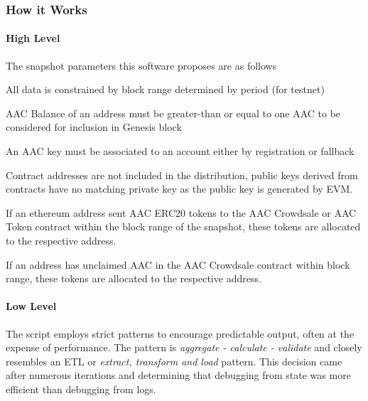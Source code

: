 \subsubsection*{How it Works}

\paragraph*{High Level}

The snapshot parameters this software proposes are as follows


\begin{DoxyEnumerate}
\item All data is constrained by block range determined by period (for testnet)
\end{DoxyEnumerate}
\begin{DoxyEnumerate}
\item A\+AC Balance of an address must be greater-\/than or equal to one A\+AC to be considered for inclusion in Genesis block
\item An A\+AC key must be associated to an account either by registration or fallback
\item Contract addresses are not included in the distribution, public keys derived from contracts have no matching private key as the public key is generated by E\+VM.
\end{DoxyEnumerate}
\begin{DoxyEnumerate}
\item If an ethereum address sent A\+AC E\+R\+C20 tokens to the A\+AC Crowdsale or A\+AC Token contract within the block range of the snapshot, these tokens are allocated to the respective address.
\item If an address has unclaimed A\+AC in the A\+AC Crowdsale contract within block range, these tokens are allocated to the respective address.
\end{DoxyEnumerate}

\label{_snapshot-install-manual-about-lowlevel}%
 \paragraph*{Low Level}

The script employs strict patterns to encourage predictable output, often at the expense of performance. The pattern is {\itshape aggregate -\/ calculate -\/ validate} and closely resembles an E\+TL or {\itshape extract, transform and load} pattern. This decision came after numerous iterations and determining that debugging from state was more efficient than debugging from logs.


